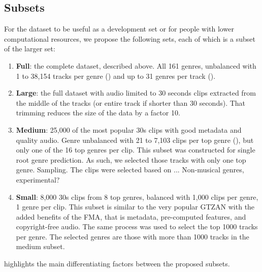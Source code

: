 \documentclass{article}
\newcommand{\todo}[1]{{\color{red} #1}}
\newcommand{\ngenres}{161 }
\begin{document}

\subsection{Subsets} \label{sec:subsets}

For the dataset to be useful as a development set or for people with lower computational resources, we propose the following sets, each of which is a subset of the larger set:
\begin{enumerate}
	\item \textbf{Full}: the complete dataset, described above. All \ngenres genres, unbalanced with 1 to 38,154 tracks per genre () and up to 31 genres per track ().
	\item \textbf{Large}: the full dataset with audio limited to 30 seconds clips extracted from the middle of the tracks (or entire track if shorter than 30 seconds). That trimming reduces the size of the data by a factor 10.
	\item \textbf{Medium}: 25,000 of the most popular 30s clips with good metadata and quality audio. Genre unbalanced with 21 to 7,103 clips per top genre (), but only one of the 16 top genres per clip.
		\todo{This subset was constructed for single root genre prediction. As such, we selected those tracks with only one top genre. Sampling. The clips were selected based on ... Non-musical genres, experimental?}
	\item \textbf{Small}: 8,000 30s clips from 8 top genres, balanced with 1,000 clips per genre, 1 genre per clip. This subset is similar to the very popular GTZAN \cite{gtzan} with the added benefits of the FMA, that is metadata, pre-computed features, and copyright-free audio. \todo{The same process was used to select the top 1000 tracks per genre. The selected genres are those with more than 1000 tracks in the medium subset.}
\end{enumerate}
 highlights the main differentiating factors between the proposed subsets.
\end{document}

